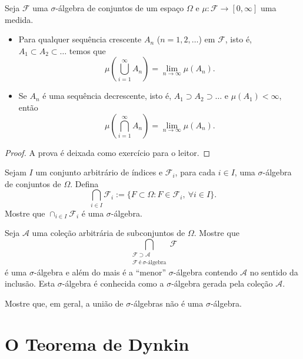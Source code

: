\begin{proposicao}
Seja $\mathcal{F}$ uma $\sigma$-álgebra de conjuntos de um espaço $\Omega$ e 
$\mu:\mathcal{F}\to [0,\infty]$ uma medida. 
\begin{itemize}
\item Para qualquer sequência crescente $A_n$
($n=1,2,\ldots$) em $\mathcal{F}$, isto é,  
$A_1\subset A_2\subset\ldots$ temos que 
$$
\mu\left( \bigcup_{i=1}^{\infty} A_n \right) = \lim_{n\to\infty} \mu(A_n).
$$ 
\item Se $A_n$ é uma sequência decrescente, isto é, 
$A_1\supset A_2\supset\ldots$ e $\mu(A_1)<\infty$, então 
$$
\mu\left( \bigcap_{i=1}^{\infty} A_n \right) = \lim_{n\to\infty} \mu(A_n).
$$ 
\end{itemize}
\end{proposicao}
\begin{proof}
A prova é deixada como exercício para o leitor.
\end{proof}




\bigskip

 

\begin{exercicio}
	Sejam $I$ um conjunto arbitrário de índices e 
	$\mathcal{F}_i$, para cada $i\in I$,
	uma $\sigma$-álgebra de conjuntos de $\Omega$.
	Defina 
	$$
	\bigcap_{i\in I}\mathcal{F}_i := 
	\{F\subset \Omega: F\in\mathcal{F}_i, \ \forall i\in I\}.
	$$
	Mostre que $\cap_{i\in I}\mathcal{F}_i$ é uma $\sigma$-álgebra.
\end{exercicio}


\begin{exercicio}\label{exercicio-sigma-alg-gerada}
	Seja $\mathcal{A}$ uma coleção arbitrária de subconjuntos de $\Omega$.
	Mostre que 
	$$
	\bigcap_{\substack{ \mathcal{F}\supset \mathcal{A}\\[0.1cm] \mathcal{F}\ \text{é}\ 
	\sigma\text{-álgebra}}}
	 \!\!\!\!\!\!\!\!\! \mathcal{F}
	$$
	é uma $\sigma$-álgebra e além do mais é a ``menor'' 
	$\sigma$-álgebra contendo $\mathcal{A}$ no sentido da inclusão. 
	Esta $\sigma$-álgebra é conhecida como a 
	$\sigma$-álgebra gerada pela coleção $\mathcal{A}$. 
\end{exercicio}

\begin{exercicio}
	Mostre que, em geral, a união de $\sigma$-álgebras 
	não é uma $\sigma$-álgebra.
\end{exercicio}

\section{O Teorema de Dynkin}

